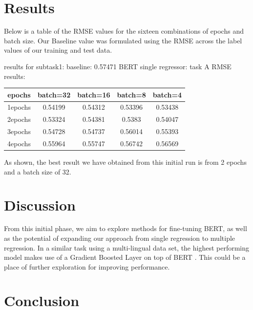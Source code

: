 \documentclass{article}
\begin{document}
\section{Results}

Below is a table of the RMSE values for the sixteen combinations of epochs and batch size. Our Baseline value was formulated using the RMSE across the label values of our training and test data.

results for subtask1:
baseline: 0.57471
BERT single regressor:
task A RMSE results:
\begin{center}
\begin{tabular}{|c|c|c|c|c|}
\hline
epochs & batch=32 & batch=16 & batch=8 & batch=4 \\
\hline
1epochs & 0.54199 & 0.54312 & 0.53396 & 0.53438 \\
2epochs & 0.53324 & 0.54381 & 0.5383 & 0.54047 \\
3epochs & 0.54728 & 0.54737 & 0.56014 & 0.55393 \\
4epochs & 0.55964 & 0.55747 & 0.56742 & 0.56569 \\
\hline
\end{tabular}
\end{center}

As shown, the best result we have obtained from this initial run is from 2 epochs and a batch size of 32.

\section{Discussion}

From this initial phase, we aim to explore methods for fine-tuning BERT, as well as the potential of expanding our approach from single regression to multiple regression. In a similar task using a multi-lingual data set, the highest performing model makes use of a Gradient Boosted Layer on top of BERT \cite{Ismailov2019HumorAB}. This could be a place of further exploration for improving performance.

\section{Conclusion}



\end{document}
